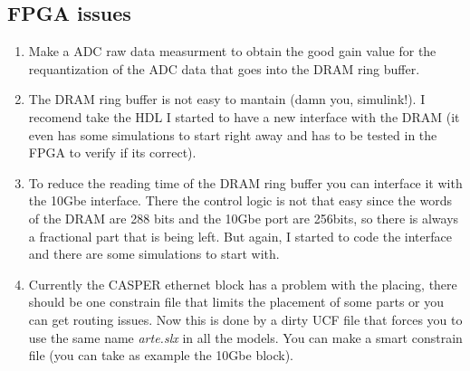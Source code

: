 \subsection{FPGA issues}
\begin{enumerate}
    \item Make a ADC raw data measurment to obtain the good gain value for the requantization of the ADC data that goes into the DRAM ring buffer.
    \item The DRAM ring buffer is not easy to mantain (damn you, simulink!). I recomend take the HDL I started to have a new interface with the DRAM (it even has some simulations to start right away and has to be tested in the FPGA to verify if its correct).
    \item To reduce the reading time of the DRAM ring buffer you can interface it with the 10Gbe interface. There the control logic is not that easy since the words of the DRAM are 288 bits and the 10Gbe port are 256bits, so there is always a fractional part that is being left. But again, I started to code the interface and there are some simulations to start with.
    \item Currently the CASPER ethernet block has a problem with the placing, there should be one constrain file that limits the placement of some parts or you can get routing issues. Now this is done by a dirty UCF file that forces you to use the same name \textit{arte.slx} in all the models. You can make a smart constrain file (you can take as example the 10Gbe block).

\end{enumerate}





